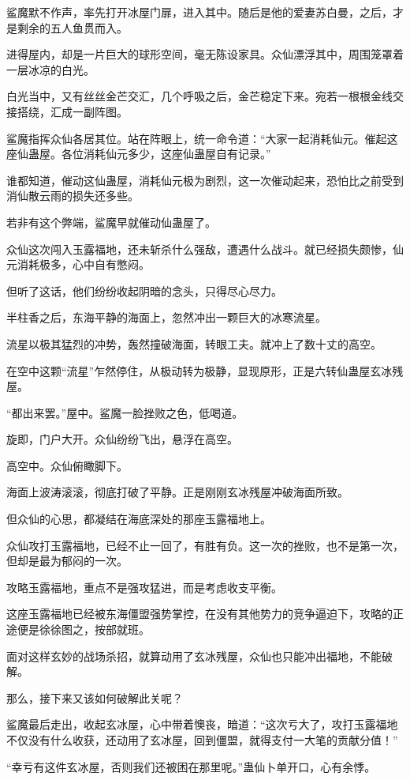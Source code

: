 \begin{this_body}
鲨魔默不作声，率先打开冰屋门扉，进入其中。随后是他的爱妻苏白曼，之后，才是剩余的五人鱼贯而入。

进得屋内，却是一片巨大的球形空间，毫无陈设家具。众仙漂浮其中，周围笼罩着一层冰凉的白光。

白光当中，又有丝丝金芒交汇，几个呼吸之后，金芒稳定下来。宛若一根根金线交接搭绕，汇成一副阵图。

鲨魔指挥众仙各居其位。站在阵眼上，统一命令道：“大家一起消耗仙元。催起这座仙蛊屋。各位消耗仙元多少，这座仙蛊屋自有记录。”

谁都知道，催动这仙蛊屋，消耗仙元极为剧烈，这一次催动起来，恐怕比之前受到消仙散云雨的损失还多些。

若非有这个弊端，鲨魔早就催动仙蛊屋了。

众仙这次闯入玉露福地，还未斩杀什么强敌，遭遇什么战斗。就已经损失颇惨，仙元消耗极多，心中自有憋闷。

但听了这话，他们纷纷收起阴暗的念头，只得尽心尽力。

半柱香之后，东海平静的海面上，忽然冲出一颗巨大的冰寒流星。

流星以极其猛烈的冲势，轰然撞破海面，转眼工夫。就冲上了数十丈的高空。

在空中这颗“流星”乍然停住，从极动转为极静，显现原形，正是六转仙蛊屋玄冰残屋。

“都出来罢。”屋中。鲨魔一脸挫败之色，低喝道。

旋即，门户大开。众仙纷纷飞出，悬浮在高空。

高空中。众仙俯瞰脚下。

海面上波涛滚滚，彻底打破了平静。正是刚刚玄冰残屋冲破海面所致。

但众仙的心思，都凝结在海底深处的那座玉露福地上。

众仙攻打玉露福地，已经不止一回了，有胜有负。这一次的挫败，也不是第一次，但却是最为郁闷的一次。

攻略玉露福地，重点不是强攻猛进，而是考虑收支平衡。

这座玉露福地已经被东海僵盟强势掌控，在没有其他势力的竞争逼迫下，攻略的正途便是徐徐图之，按部就班。

面对这样玄妙的战场杀招，就算动用了玄冰残屋，众仙也只能冲出福地，不能破解。

那么，接下来又该如何破解此关呢？

鲨魔最后走出，收起玄冰屋，心中带着懊丧，暗道：“这次亏大了，攻打玉露福地不仅没有什么收获，还动用了玄冰屋，回到僵盟，就得支付一大笔的贡献分值！”

“幸亏有这件玄冰屋，否则我们还被困在那里呢。”蛊仙卜单开口，心有余悸。


\end{this_body}
